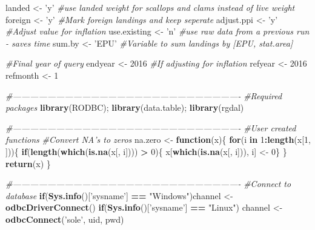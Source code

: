 \documentclass[]{article}
\newenvironment{Shaded}{\begin{snugshade}}{\end{snugshade}}
\newcommand{\KeywordTok}[1]{\textcolor[rgb]{0.13,0.29,0.53}{\textbf{#1}}}
\newcommand{\DecValTok}[1]{\textcolor[rgb]{0.00,0.00,0.81}{#1}}
\newcommand{\StringTok}[1]{\textcolor[rgb]{0.31,0.60,0.02}{#1}}
\newcommand{\CommentTok}[1]{\textcolor[rgb]{0.56,0.35,0.01}{\textit{#1}}}
\newcommand{\ControlFlowTok}[1]{\textcolor[rgb]{0.13,0.29,0.53}{\textbf{#1}}}
\newcommand{\OperatorTok}[1]{\textcolor[rgb]{0.81,0.36,0.00}{\textbf{#1}}}
\newcommand{\NormalTok}[1]{#1}
\begin{document}
\begin{Shaded}
\begin{Highlighting}[]
\NormalTok{landed       <-}\StringTok{ 'y'} \CommentTok{#use landed weight for scallops and clams instead of live weight}
\NormalTok{foreign      <-}\StringTok{ 'y'} \CommentTok{#Mark foreign landings and keep seperate}
\NormalTok{adjust.ppi   <-}\StringTok{ 'y'} \CommentTok{#Adjust value for inflation}
\NormalTok{use.existing <-}\StringTok{ 'n'} \CommentTok{#use raw data from a previous run - saves time}
\NormalTok{sum.by       <-}\StringTok{ 'EPU'} \CommentTok{#Variable to sum landings by [EPU, stat.area]}

\CommentTok{#Final year of query}
\NormalTok{endyear <-}\StringTok{ }\DecValTok{2016}
\CommentTok{#If adjusting for inflation}
\NormalTok{refyear  <-}\StringTok{ }\DecValTok{2016}
\NormalTok{refmonth <-}\StringTok{ }\DecValTok{1}

\CommentTok{#-------------------------------------------------------------------------------}
\CommentTok{#Required packages}
\KeywordTok{library}\NormalTok{(RODBC); }\KeywordTok{library}\NormalTok{(data.table); }\KeywordTok{library}\NormalTok{(rgdal)}

\CommentTok{#-------------------------------------------------------------------------------}
\CommentTok{#User created functions }
\CommentTok{#Convert NA's to zeros}
\NormalTok{na.zero <-}\StringTok{ }\ControlFlowTok{function}\NormalTok{(x)\{}
  \ControlFlowTok{for}\NormalTok{(i }\ControlFlowTok{in} \DecValTok{1}\OperatorTok{:}\KeywordTok{length}\NormalTok{(x[}\DecValTok{1}\NormalTok{, ]))\{}
    \ControlFlowTok{if}\NormalTok{(}\KeywordTok{length}\NormalTok{(}\KeywordTok{which}\NormalTok{(}\KeywordTok{is.na}\NormalTok{(x[, i]))) }\OperatorTok{>}\StringTok{ }\DecValTok{0}\NormalTok{)\{}
\NormalTok{      x[}\KeywordTok{which}\NormalTok{(}\KeywordTok{is.na}\NormalTok{(x[, i])), i] <-}\StringTok{ }\DecValTok{0}\NormalTok{\}}
\NormalTok{    \}}
    \KeywordTok{return}\NormalTok{(x)}
\NormalTok{  \} }
  
\CommentTok{#-------------------------------------------------------------------------------}
\CommentTok{#Connect to database}
\ControlFlowTok{if}\NormalTok{(}\KeywordTok{Sys.info}\NormalTok{()[}\StringTok{'sysname'}\NormalTok{] }\OperatorTok{==}\StringTok{ "Windows"}\NormalTok{)channel <-}\StringTok{ }\KeywordTok{odbcDriverConnect}\NormalTok{()}
\ControlFlowTok{if}\NormalTok{(}\KeywordTok{Sys.info}\NormalTok{()[}\StringTok{'sysname'}\NormalTok{] }\OperatorTok{==}\StringTok{ "Linux"}\NormalTok{)  channel <-}\StringTok{ }\KeywordTok{odbcConnect}\NormalTok{(}\StringTok{'sole'}\NormalTok{, uid, pwd)}


\end{Highlighting}
\end{Shaded}
\end{document}
